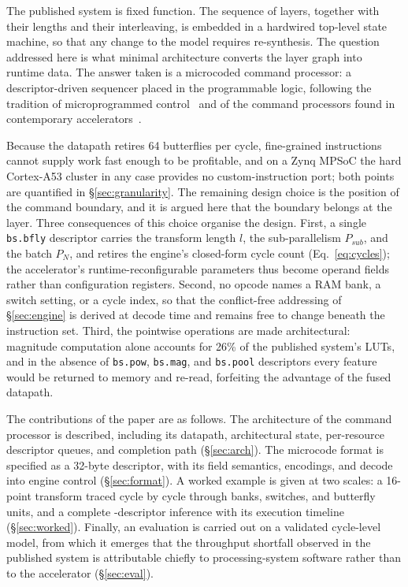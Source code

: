 \documentclass[twocolumn,10pt]{article}
\newcommand{\Psub}{P_{sub}}
\newcommand{\PN}{P_{N}}
\newcommand{\op}[1]{\texttt{#1}}
\begin{document}
The published system is fixed function.  The sequence of layers, together with
their lengths and their interleaving, is embedded in a hardwired top-level state
machine, so that any change to the model requires re-synthesis.  The question
addressed here is what minimal architecture converts the layer graph into
runtime data.  The answer taken is a microcoded command processor: a
descriptor-driven sequencer placed in the programmable logic, following the
tradition of microprogrammed control~\cite{wilkes1953} and of the command
processors found in contemporary
accelerators~\cite{nvdla,gemmini,vta,tpu}.

Because the datapath retires 64 butterflies per cycle, fine-grained instructions
cannot supply work fast enough to be profitable, and on a Zynq MPSoC the hard
Cortex-A53 cluster in any case provides no custom-instruction port; both points
are quantified in \S\ref{sec:granularity}.  The remaining design choice is the
position of the command boundary, and it is argued here that the boundary
belongs at the layer.  Three consequences of this choice organise the design.
First, a single \op{bs.bfly} descriptor carries the transform length $l$, the
sub-parallelism $\Psub$, and the batch $\PN$, and retires the engine's
closed-form cycle count (Eq.~\ref{eq:cycles}); the accelerator's
runtime-reconfigurable parameters thus become operand fields rather than
configuration registers.  Second, no opcode names a RAM bank, a switch setting,
or a cycle index, so that the conflict-free addressing of \S\ref{sec:engine} is
derived at decode time and remains free to change beneath the instruction set.
Third, the pointwise operations are made architectural: magnitude computation
alone accounts for 26\% of the published system's LUTs, and in the absence of
\op{bs.pow}, \op{bs.mag}, and \op{bs.pool} descriptors every feature would be
returned to memory and re-read, forfeiting the advantage of the fused datapath.

The contributions of the paper are as follows.  The architecture of the command
processor is described, including its datapath, architectural state,
per-resource descriptor queues, and completion path (\S\ref{sec:arch}).  The
microcode format is specified as a 32-byte descriptor, with its field semantics,
encodings, and decode into engine control (\S\ref{sec:format}).  A worked
example is given at two scales: a 16-point transform traced cycle by cycle
through banks, switches, and butterfly units, and a complete
\ProgCmds-descriptor inference with its execution timeline (\S\ref{sec:worked}).
Finally, an evaluation is carried out on a validated cycle-level model, from
which it emerges that the throughput shortfall observed in the published system
is attributable chiefly to processing-system software rather than to the
accelerator (\S\ref{sec:eval}).
\end{document}
